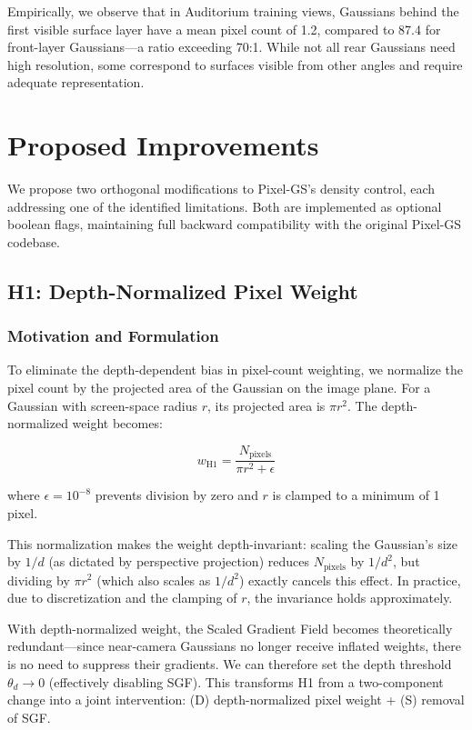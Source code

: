 \documentclass[conference]{IEEEtran}
\begin{document}
Empirically, we observe that in Auditorium training views, Gaussians behind the first visible surface layer have a mean pixel count of 1.2, compared to 87.4 for front-layer Gaussians—a ratio exceeding 70:1. While not all rear Gaussians need high resolution, some correspond to surfaces visible from other angles and require adequate representation.

\section{Proposed Improvements}

We propose two orthogonal modifications to Pixel-GS's density control, each addressing one of the identified limitations. Both are implemented as optional boolean flags, maintaining full backward compatibility with the original Pixel-GS codebase.

\subsection{H1: Depth-Normalized Pixel Weight}

\subsubsection{Motivation and Formulation}

To eliminate the depth-dependent bias in pixel-count weighting, we normalize the pixel count by the projected area of the Gaussian on the image plane. For a Gaussian with screen-space radius $r$, its projected area is $\pi r^2$. The depth-normalized weight becomes:

\begin{equation}
w_{\text{H1}} = \frac{N_{\text{pixels}}}{\pi r^2 + \epsilon}
\end{equation}

where $\epsilon = 10^{-8}$ prevents division by zero and $r$ is clamped to a minimum of 1 pixel.

This normalization makes the weight depth-invariant: scaling the Gaussian's size by $1/d$ (as dictated by perspective projection) reduces $N_{\text{pixels}}$ by $1/d^2$, but dividing by $\pi r^2$ (which also scales as $1/d^2$) exactly cancels this effect. In practice, due to discretization and the clamping of $r$, the invariance holds approximately.

With depth-normalized weight, the Scaled Gradient Field becomes theoretically redundant—since near-camera Gaussians no longer receive inflated weights, there is no need to suppress their gradients. We can therefore set the depth threshold $\theta_d \to 0$ (effectively disabling SGF). This transforms H1 from a two-component change into a joint intervention: (D) depth-normalized pixel weight + (S) removal of SGF.
\end{document}
